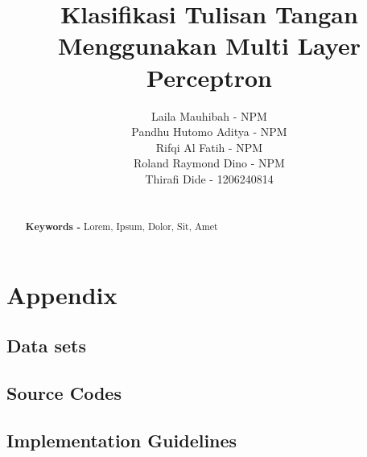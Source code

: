 \documentclass{article}
\begin{document}
\title{Klasifikasi Tulisan Tangan Menggunakan Multi Layer Perceptron}
\author{
	Laila Mauhibah - NPM \\
	Pandhu Hutomo Aditya - NPM \\
	Rifqi Al Fatih - NPM \\
	Roland Raymond Dino - NPM \\
	Thirafi Dide - 1206240814
}

\maketitle

\begin{abstract}
\lipsum[1]
~\\
\noindent \textbf{Keywords - }Lorem, Ipsum, Dolor, Sit, Amet
\end{abstract}

\pagebreak

\tableofcontents

\pagebreak











\pagebreak

\section{Appendix}

	\subsection{Data sets}
	\lipsum[1]

	\subsection{Source Codes}
	\lipsum[1]

	\subsection{Implementation Guidelines}
	\lipsum[1]
\end{document}
